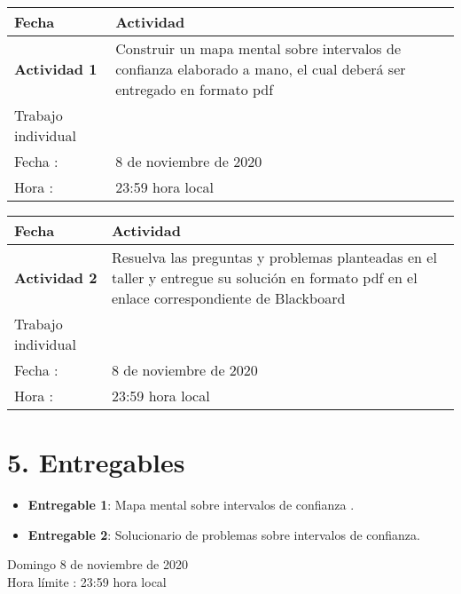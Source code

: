 \documentclass[base=hide,11pt]{elegantbook}
\begin{document}
\begin{tabular}{p{4cm}p{10cm}}
\hline	
Fecha                   & Actividad	\\
\hline 	
{\bf Actividad 1}            & Construir un mapa mental sobre intervalos de confianza elaborado a mano, el cual deberá ser entregado en formato pdf \\
Trabajo individual     & \ \\
Fecha  : & 8 de noviembre de 2020\\
Hora   : & 23:59 hora local \\
\hline 
\end{tabular}
\begin{tabular}{p{4cm}p{10cm}}
	\hline	
	Fecha                   & Actividad	\\
	\hline
{\bf Actividad 2}  & Resuelva las preguntas y problemas planteadas en  el  taller y entregue su solución  en formato  pdf en el enlace correspondiente de  Blackboard\\
Trabajo individual &   \\
Fecha  : & 8 de noviembre de 2020\\
Hora   : & 23:59 hora local \\
\hline 

\hline 
\end{tabular}
%
%



\section*{5. Entregables}
\begin{itemize}
\item {\bf Entregable 1}: Mapa mental sobre intervalos de confianza .
\item {\bf Entregable 2}: Solucionario de problemas sobre intervalos de confianza.  
\end{itemize}
\vspace{1cm}

Domingo 8 de noviembre de 2020\\
Hora límite : 23:59  hora  local


\end{document}
